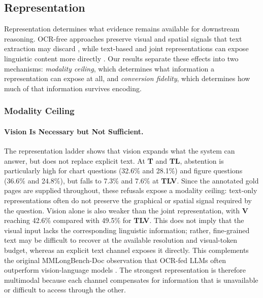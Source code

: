 \subsection{Representation}
\label{sec:findings_representation}

Representation determines what evidence remains available for downstream reasoning. OCR-free approaches preserve visual and spatial signals that text extraction may discard \citep{cho2024m3docrag,tanaka2025vdocrag}, while text-based and joint representations can expose linguistic content more directly \citep{hannan2026docslm,han2025mdocagent,suri2025visdom}. Our results separate these effects into two mechanisms: \emph{modality ceiling}, which determines what information a representation can expose at all, and \emph{conversion fidelity}, which determines how much of that information survives encoding.

\subsubsection{Modality Ceiling}



\paragraph{Vision Is Necessary but Not Sufficient.} The representation ladder shows that vision expands what the system can answer, but does not replace explicit text. At \textbf{T} and \textbf{TL}, abstention is particularly high for chart questions (32.6\% and 28.1\%) and figure questions (36.6\% and 24.8\%), but falls to 7.3\% and 7.6\% at \textbf{TLV}. Since the annotated gold pages are supplied throughout, these refusals expose a modality ceiling: text-only representations often do not preserve the graphical or spatial signal required by the question. Vision alone is also weaker than the joint representation, with \textbf{V} reaching 42.6\% compared with 49.5\% for \textbf{TLV}. This does not imply that the visual input lacks the corresponding linguistic information; rather, fine-grained text may be difficult to recover at the available resolution and visual-token budget, whereas an explicit text channel exposes it directly. This complements the original MMLongBench-Doc observation that OCR-fed LLMs often outperform vision-language models \citep{ma2024mmlongbench}. The strongest representation is therefore multimodal because each channel compensates for information that is unavailable or difficult to access through the other.

